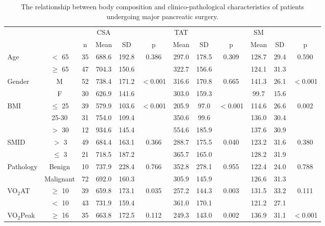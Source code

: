 \begin{sidewaystable}[p]
\caption{The relationship between body composition and clinico-pathological characteristics of patients undergoing major pancreatic surgery.}
\label{table:bc_clinical}
\centering
\begin{tabular}{l c c | c c c | c c c | c c c}
	           &           &    & CSA   &       &          & TAT   &       &          & SM    &      &  \\
	           &           & n  & Mean  & SD    & p        & Mean  & SD    & p        & Mean  & SD   & p        \\ \hline
	Age        & $<$ 65    & 35 & 688.6 & 192.8 & 0.386    & 297.0 & 178.5 & 0.309    & 128.7 & 29.4 & 0.590    \\
	           & $\geq$ 65 & 47 & 704.3 & 150.6 &          & 322.7 & 156.6 &          & 124.1 & 31.3 &  \\
	Gender     & M         & 52 & 738.4 & 171.2 & $<$0.001 & 316.6 & 170.8 & 0.665    & 141.3 & 26.1 & $<$0.001 \\
	           & F         & 30 & 626.9 & 141.6 &          & 303.0 & 159.3 &          & 99.7  & 15.6 &  \\
	BMI        & $\leq$ 25 & 39 & 579.9 & 103.6 & $<$0.001 & 205.9 & 97.0  & $<$0.001 & 114.6 & 26.6 & 0.002    \\
	           & 25-30     & 31 & 754.0 & 109.4 &          & 350.6 & 99.6  &          & 136.0 & 30.4 &  \\
	           & $>$ 30    & 12 & 934.6 & 145.4 &          & 554.6 & 185.9 &          & 137.6 & 30.9 &  \\
	SMID       & $>$ 3     & 49 & 684.4 & 163.1 & 0.366    & 288.7 & 175.5 & 0.040    & 123.2 & 31.6 & 0.380    \\
	           & $\leq$ 3  & 21 & 718.5 & 187.2 &          & 365.7 & 165.0 &          & 128.2 & 31.9 &  \\
	Pathology  & Benign    & 10 & 737.9 & 228.4 & 0.766    & 352.8 & 278.1 & 0.955    & 122.4 & 24.0 & 0.788    \\
	           & Malignant & 72 & 692.0 & 160.3 &          & 305.9 & 145.9 &          & 126.6 & 31.3 &  \\
	VO$_2$AT   & $\geq$ 10 & 39 & 659.8 & 173.1 & 0.035    & 257.2 & 144.3 & 0.003    & 131.5 & 33.2 & 0.111    \\
	           & $<$ 10    & 43 & 731.9 & 159.4 &          & 361.0 & 170.1 &          & 121.2 & 27.1 &  \\
	VO$_2$Peak & $\geq$ 16 & 35 & 663.8 & 172.5 & 0.112    & 249.3 & 143.0 & 0.002    & 136.9 & 31.1 & $<$0.001 \\

\end{tabular}
\end{sidewaystable}
